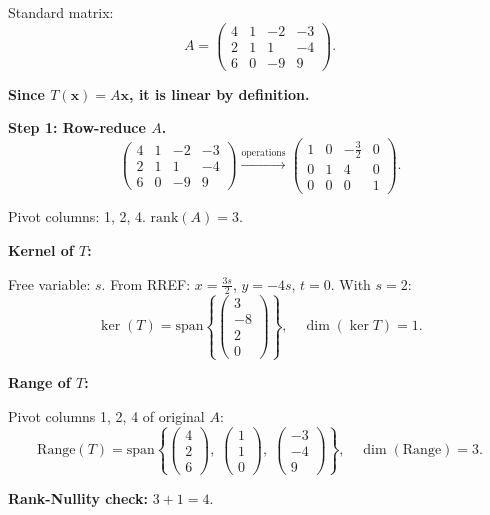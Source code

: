 \documentclass[12pt,a3paper]{article}
\begin{document}
\begin{tcolorbox}[enhanced,breakable,
  colback=cF!4,colframe=cF,boxrule=0.8pt,arc=5pt,
  title={\textbf{Answer --- $T:\mathbb{R}^4\to\mathbb{R}^3$ (MATH 143/247): $\ker T$ and $\mathrm{Range}(T)$}},
  fonttitle=\bfseries\color{white},colbacktitle=cF]

Standard matrix:
\[
A=\begin{pmatrix}4&1&-2&-3\\2&1&1&-4\\6&0&-9&9\end{pmatrix}.
\]

\textbf{Since $T(\mathbf{x})=A\mathbf{x}$, it is linear by definition.}

\textbf{Step 1: Row-reduce $A$.}
\[
\begin{pmatrix}4&1&-2&-3\\2&1&1&-4\\6&0&-9&9\end{pmatrix}
\xrightarrow{\text{operations}}
\begin{pmatrix}1&0&-\frac{3}{2}&0\\0&1&4&0\\0&0&0&1\end{pmatrix}.
\]

Pivot columns: 1, 2, 4. $\mathrm{rank}(A)=3$.

\medskip\textbf{Kernel of $T$:}

Free variable: $s$. From RREF: $x=\tfrac{3s}{2}$, $y=-4s$, $t=0$. With $s=2$:
\[
\boxed{\ker(T)=\mathrm{span}\!\left\{\begin{pmatrix}3\\-8\\2\\0\end{pmatrix}\right\},\quad\dim(\ker T)=1.}
\]

\medskip\textbf{Range of $T$:}

Pivot columns 1, 2, 4 of original $A$:
\[
\boxed{\mathrm{Range}(T)=\mathrm{span}\!\left\{\begin{pmatrix}4\\2\\6\end{pmatrix},\;\begin{pmatrix}1\\1\\0\end{pmatrix},\;\begin{pmatrix}-3\\-4\\9\end{pmatrix}\right\},\quad\dim(\mathrm{Range})=3.}
\]

\textbf{Rank-Nullity check:} $3+1=4$. \checkmark

\end{tcolorbox}
\end{document}
